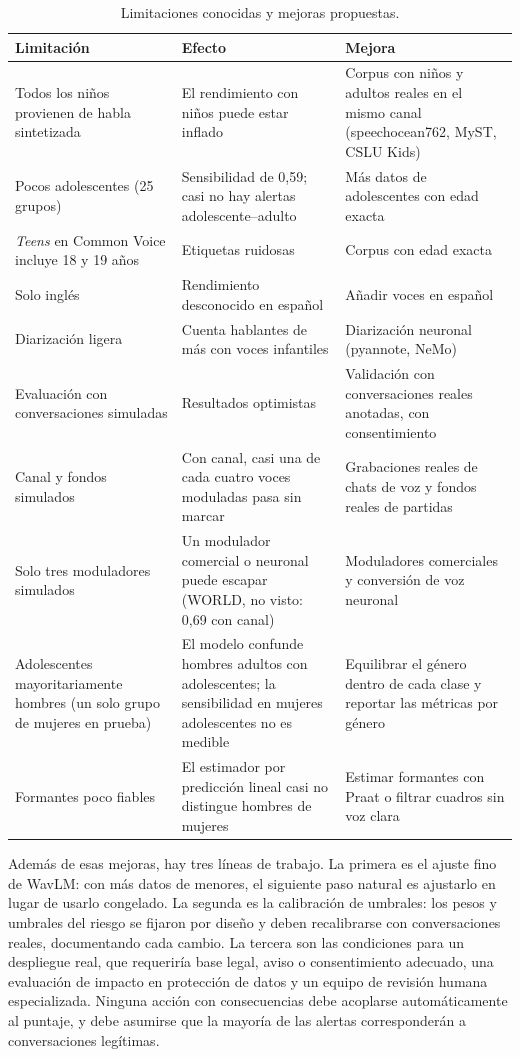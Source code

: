 \documentclass[11pt,a4paper]{article}
\begin{document}
\begin{table}[H]
\centering
\caption{Limitaciones conocidas y mejoras propuestas.}
\label{tab:futuro}
\small
\begin{tabularx}{\linewidth}{@{}>{\raggedright\arraybackslash}p{4cm}L>{\raggedright\arraybackslash}p{4.3cm}@{}}
\toprule
\textbf{Limitación} & \textbf{Efecto} & \textbf{Mejora} \\
\midrule
Todos los niños provienen de habla sintetizada & El rendimiento con niños puede estar inflado & Corpus con niños y adultos reales en el mismo canal (speechocean762, MyST, CSLU Kids) \\
Pocos adolescentes (25 grupos) & Sensibilidad de 0,59; casi no hay alertas adolescente--adulto & Más datos de adolescentes con edad exacta \\
\emph{Teens} en Common Voice incluye 18 y 19 años & Etiquetas ruidosas & Corpus con edad exacta \\
Solo inglés & Rendimiento desconocido en español & Añadir voces en español \\
Diarización ligera & Cuenta hablantes de más con voces infantiles & Diarización neuronal (pyannote, NeMo) \\
Evaluación con conversaciones simuladas & Resultados optimistas & Validación con conversaciones reales anotadas, con consentimiento \\
Canal y fondos simulados & Con canal, casi una de cada cuatro voces moduladas pasa sin marcar & Grabaciones reales de chats de voz y fondos reales de partidas \\
Solo tres moduladores simulados & Un modulador comercial o neuronal puede escapar (WORLD, no visto: 0,69 con canal) & Moduladores comerciales y conversión de voz neuronal \\
Adolescentes mayoritariamente hombres (un solo grupo de mujeres en prueba) & El modelo confunde hombres adultos con adolescentes; la sensibilidad en mujeres adolescentes no es medible & Equilibrar el género dentro de cada clase y reportar las métricas por género \\
Formantes poco fiables & El estimador por predicción lineal casi no distingue hombres de mujeres & Estimar formantes con Praat o filtrar cuadros sin voz clara \\
\bottomrule
\end{tabularx}
\end{table}

Además de esas mejoras, hay tres líneas de trabajo. La primera es el ajuste fino de WavLM: con más datos de menores, el siguiente paso natural es ajustarlo en lugar de usarlo congelado. La segunda es la calibración de umbrales: los pesos y umbrales del riesgo se fijaron por diseño y deben recalibrarse con conversaciones reales, documentando cada cambio. La tercera son las condiciones para un despliegue real, que requeriría base legal, aviso o consentimiento adecuado, una evaluación de impacto en protección de datos y un equipo de revisión humana especializada. Ninguna acción con consecuencias debe acoplarse automáticamente al puntaje, y debe asumirse que la mayoría de las alertas corresponderán a conversaciones legítimas.
\end{document}

